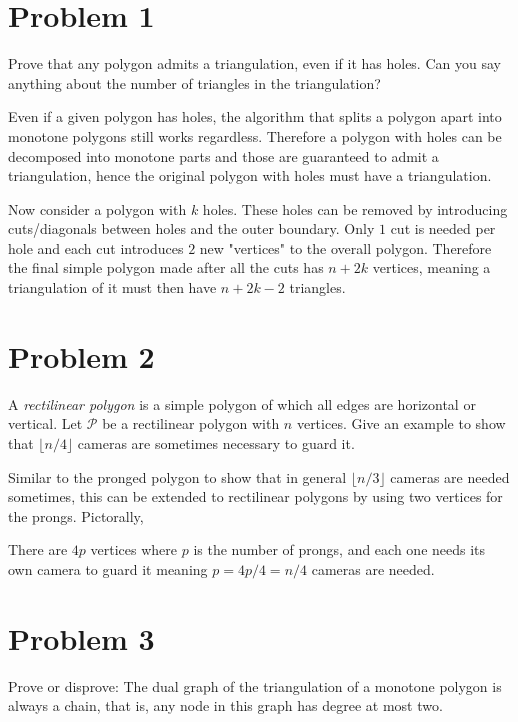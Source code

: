 \documentclass[12pt]{extarticle}
\begin{document}
\section*{Problem 1}
Prove that any polygon admits a triangulation, even if it has holes. Can you say anything about the number of triangles in the triangulation?

\begin{solution}
    Even if a given polygon has holes, the algorithm that splits a polygon apart into monotone polygons still works regardless. Therefore a polygon with holes can be decomposed into monotone parts and those are guaranteed to admit a triangulation, hence the original polygon with holes must have a triangulation. 

    \hfill

    Now consider a polygon with $k$ holes. These holes can be removed by introducing cuts/diagonals between holes and the outer boundary. Only $1$ cut is needed per hole and each cut introduces $2$ new "vertices" to the overall polygon. Therefore the final simple polygon made after all the cuts has $n + 2k$ vertices, meaning a triangulation of it must then have $n + 2k - 2$ triangles.
\end{solution}

\section*{Problem 2}
A \textit{rectilinear polygon} is a simple polygon of which all edges are horizontal or vertical. Let $\mathcal{P}$ be a rectilinear polygon with $n$ vertices. Give an example to show that $\lfloor n / 4 \rfloor$ cameras are sometimes necessary to guard it.

\begin{solution}
    Similar to the pronged polygon to show that in general $\lfloor n / 3 \rfloor$ cameras are needed sometimes, this can be extended to rectilinear polygons by using two vertices for the prongs. Pictorally,
    
    \begin{center}
        
    \end{center}

    There are $4p$ vertices where $p$ is the number of prongs, and each one needs its own camera to guard it meaning $p = 4p / 4 = n / 4$ cameras are needed.
\end{solution}

\section*{Problem 3}
Prove or disprove: The dual graph of the triangulation of a monotone polygon is always a chain, that is, any node in this graph has degree at most two.
\end{document}
